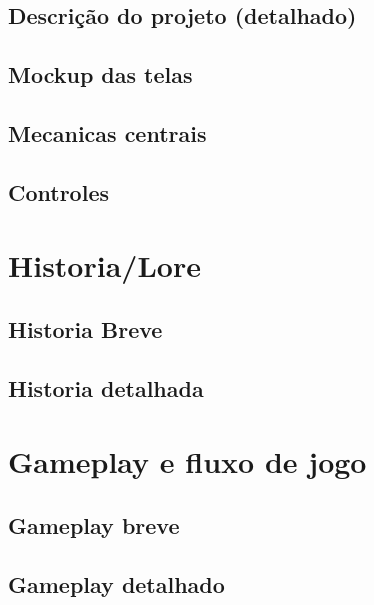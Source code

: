     \subsection{Descrição do projeto (detalhado)}%
    \subsection{Mockup das telas}%
    \subsection{Mecanicas centrais}%
    \subsection{Controles}%
    
\section{Historia/Lore}%
    \subsection{Historia Breve}%
    \subsection{Historia detalhada}%

\section{Gameplay e fluxo de jogo}%
    \subsection{Gameplay breve}%
    \subsection{Gameplay detalhado}%



